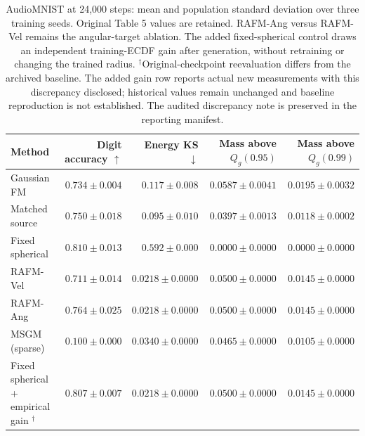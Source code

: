 \begin{table}[t]\centering\small
\begin{tabular}{lrrrr}
\toprule
Method & Digit accuracy $\uparrow$ & Energy KS $\downarrow$ & Mass above $Q_g(0.95)$ & Mass above $Q_g(0.99)$ \\
\midrule
Gaussian FM & $0.734 \pm 0.004$ & $0.117 \pm 0.008$ & $0.0587 \pm 0.0041$ & $0.0195 \pm 0.0032$ \\
Matched source & $0.750 \pm 0.018$ & $0.095 \pm 0.010$ & $0.0397 \pm 0.0013$ & $0.0118 \pm 0.0002$ \\
Fixed spherical & $0.810 \pm 0.013$ & $0.592 \pm 0.000$ & $0.0000 \pm 0.0000$ & $0.0000 \pm 0.0000$ \\
RAFM-Vel & $0.711 \pm 0.014$ & $0.0218 \pm 0.0000$ & $0.0500 \pm 0.0000$ & $0.0145 \pm 0.0000$ \\
RAFM-Ang & $0.764 \pm 0.025$ & $0.0218 \pm 0.0000$ & $0.0500 \pm 0.0000$ & $0.0145 \pm 0.0000$ \\
MSGM (sparse) & $0.100 \pm 0.000$ & $0.0340 \pm 0.0000$ & $0.0465 \pm 0.0000$ & $0.0105 \pm 0.0000$ \\
\midrule
Fixed spherical + empirical gain $^{\dagger}$ & $0.807 \pm 0.007$ & $0.0218 \pm 0.0000$ & $0.0500 \pm 0.0000$ & $0.0145 \pm 0.0000$ \\
\bottomrule
\end{tabular}
\caption{AudioMNIST at 24,000 steps: mean and population standard deviation over three training seeds. Original Table 5 values are retained. RAFM-Ang versus RAFM-Vel remains the angular-target ablation. The added fixed-spherical control draws an independent training-ECDF gain after generation, without retraining or changing the trained radius. $^{\dagger}$Original-checkpoint reevaluation differs from the archived baseline. The added gain row reports actual new measurements with this discrepancy disclosed; historical values remain unchanged and baseline reproduction is not established. The audited discrepancy note is preserved in the reporting manifest.}
\label{tab:audio-with-empirical-gain}
\end{table}
